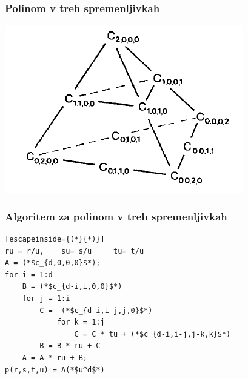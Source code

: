 \documentclass{beamer}
\begin{document}
\begin{frame}
\frametitle{Polinom v treh spremenljivkah}
\begin{center}
\includegraphics[width=0.7\linewidth]{tetraeder.PNG}
\end{center}
\end{frame}

\begin{frame}[fragile]
\frametitle{Algoritem za polinom v treh spremenljivkah}
\begin{lstlisting}[escapeinside={(*}{*)}]
ru = r/u,	 su= s/u	 tu= t/u
A = (*$c_{d,0,0,0}$*);
for i = 1:d
    B = (*$c_{d-i,i,0,0}$*)
    for j = 1:i
        C =  (*$c_{d-i,i-j,j,0}$*)
            for k = 1:j
                C = C * tu + (*$c_{d-i,i-j,j-k,k}$*)
        B = B * ru + C
    A = A * ru + B;
p(r,s,t,u) = A(*$u^d$*)
\end{lstlisting}
\end{frame}
\end{document}
